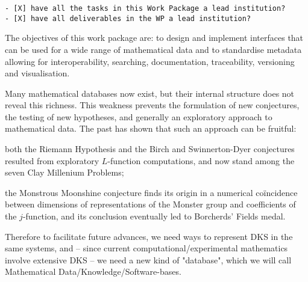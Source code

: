 \begin{draft}
\begin{verbatim}
- [X] have all the tasks in this Work Package a lead institution?
- [X] have all deliverables in the WP a lead institution?
\end{verbatim}
\end{draft}



\begin{workpackage}[id=dksbases,wphases=1-48!.5,
  title=Data/Knowledge/Software-Bases,lead=JU,
  ZHRM=12,JURM=36,USHRM=12,UWRM=25,SARM=10,LLRM=2,PSRM=4]


\begin{wpobjectives}
  The objectives of this work package are: to design and implement interfaces that can be
  used for a wide range of mathematical data and to standardise metadata allowing for
  interoperability, searching, documentation, traceability, versioning and visualisation.
\end{wpobjectives}

\begin{wpdescription}
  Many mathematical databases now exist, but their internal structure does not reveal this
  richness. This weakness prevents the formulation of new conjectures, the testing of new
  hypotheses, and generally an exploratory approach to mathematical data. The past has
  shown that such an approach can be fruitful:
  \begin{compactitem}
  \item both the Riemann Hypothesis and the Birch and Swinnerton-Dyer conjectures resulted
    from exploratory $L$-function computations, and now stand among the seven Clay
    Millenium Problems;
  \item the Monstrous Moonshine conjecture finds its origin in a numerical co\"incidence
    between dimensions of representations of the Monster group and coefficients of the
    $j$-function, and its conclusion eventually led to Borcherds' Fields medal.
  \end{compactitem}

  Therefore to facilitate future advances, we need ways to represent DKS in the same
  systems, and -- since current computational/experimental mathematics involve extensive
  DKS -- we need a new kind of "database", which we will call Mathematical
  Data/Knowledge/Software-bases.


\end{wpdescription}
\end{workpackage}
